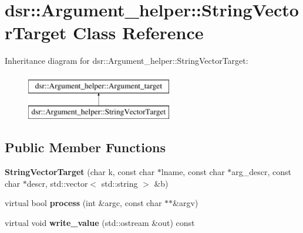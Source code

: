 \hypertarget{classdsr_1_1_argument__helper_1_1_string_vector_target}{
\section{dsr::Argument\_\-helper::StringVectorTarget Class Reference}
\label{classdsr_1_1_argument__helper_1_1_string_vector_target}
}
Inheritance diagram for dsr::Argument\_\-helper::StringVectorTarget:\begin{figure}[H]
\begin{center}
\leavevmode
\includegraphics[height=2.000000cm]{classdsr_1_1_argument__helper_1_1_string_vector_target}
\end{center}
\end{figure}
\subsection*{Public Member Functions}
\begin{DoxyCompactItemize}
\item 
\hypertarget{classdsr_1_1_argument__helper_1_1_string_vector_target_a895759376a79e9cc282783a3a5be7cc7}{
{\bfseries StringVectorTarget} (char k, const char $\ast$lname, const char $\ast$arg\_\-descr, const char $\ast$descr, std::vector$<$ std::string $>$ \&b)}
\label{classdsr_1_1_argument__helper_1_1_string_vector_target_a895759376a79e9cc282783a3a5be7cc7}

\item 
\hypertarget{classdsr_1_1_argument__helper_1_1_string_vector_target_a711141af8e59f26e382f8ce6b5791d61}{
virtual bool {\bfseries process} (int \&argc, const char $\ast$$\ast$\&argv)}
\label{classdsr_1_1_argument__helper_1_1_string_vector_target_a711141af8e59f26e382f8ce6b5791d61}

\item 
\hypertarget{classdsr_1_1_argument__helper_1_1_string_vector_target_a85cc5e5007041c129d674e8fda98f6db}{
virtual void {\bfseries write\_\-value} (std::ostream \&out) const }
\label{classdsr_1_1_argument__helper_1_1_string_vector_target_a85cc5e5007041c129d674e8fda98f6db}

\end{DoxyCompactItemize}
